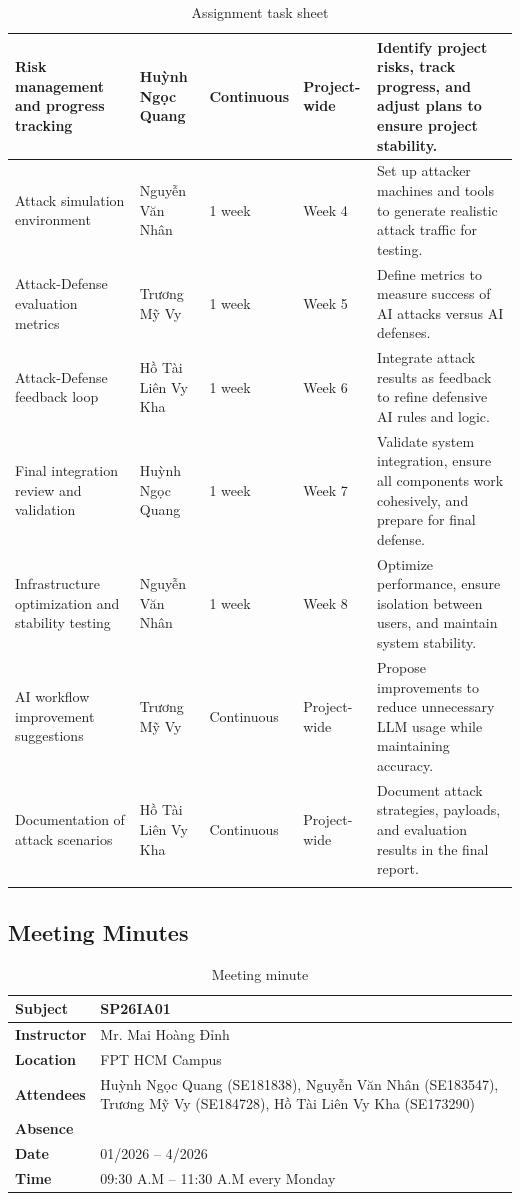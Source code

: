\begin{longtable}{|p{3.0cm}|p{2.4cm}|p{1.9cm}|p{1.6cm}|p{4.4cm}|}
	\hline
	Risk management and progress tracking & Huỳnh Ngọc Quang & Continuous & Project-wide & Identify project risks, track progress, and adjust plans to ensure project stability. \\
	\hline
	Attack simulation environment & Nguyễn Văn Nhân & 1 week & Week 4 & Set up attacker machines and tools to generate realistic attack traffic for testing. \\
	\hline
	Attack-Defense evaluation metrics & Trương Mỹ Vy & 1 week & Week 5 & Define metrics to measure success of AI attacks versus AI defenses. \\
	\hline
	Attack-Defense feedback loop & Hồ Tài Liên Vy Kha & 1 week & Week 6 & Integrate attack results as feedback to refine defensive AI rules and logic. \\
	\hline
	Final integration review and validation & Huỳnh Ngọc Quang & 1 week & Week 7 & Validate system integration, ensure all components work cohesively, and prepare for final defense. \\
	\hline
	Infrastructure optimization and stability testing & Nguyễn Văn Nhân & 1 week & Week 8 & Optimize performance, ensure isolation between users, and maintain system stability. \\
	\hline
	AI workflow improvement suggestions & Trương Mỹ Vy & Continuous & Project-wide & Propose improvements to reduce unnecessary LLM usage while maintaining accuracy. \\
	\hline
	Documentation of attack scenarios & Hồ Tài Liên Vy Kha & Continuous & Project-wide & Document attack strategies, payloads, and evaluation results in the final report. \\
	\hline
	\caption{Assignment task sheet} \\
\end{longtable}
\endgroup

\subsection{Meeting Minutes}
\begin{table}[!htbp]
	\centering
	\begingroup
	\small
	\setlength{\tabcolsep}{4pt}
	\renewcommand{\arraystretch}{1.1}
	\begin{tabularx}{\textwidth}{|p{3.2cm}|X|}
		\hline
		\textbf{Subject} & SP26IA01 \\
		\hline
		\textbf{Instructor} & Mr. Mai Hoàng Đỉnh \\
		\hline
		\textbf{Location} & FPT HCM Campus\\
		\hline
		\textbf{Attendees} & Huỳnh Ngọc Quang (SE181838), Nguyễn Văn Nhân (SE183547), Trương Mỹ Vy (SE184728), Hồ Tài Liên Vy Kha (SE173290) \\
		\hline
		\textbf{Absence} &  \\
		\hline
		\textbf{Date} & 01/2026 -- 4/2026 \\
		\hline
		\textbf{Time} & 09:30 A.M -- 11:30 A.M every Monday \\
		\hline
	\end{tabularx}
	\caption{Meeting minute}
	\endgroup
\end{table}